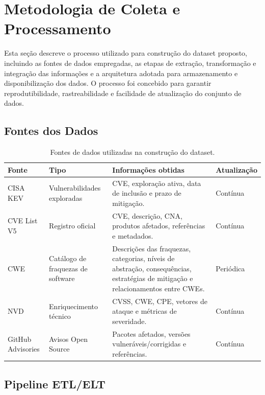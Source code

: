 \section{Metodologia de Coleta e Processamento}

Esta seção descreve o processo utilizado para construção do dataset proposto, incluindo as fontes de dados empregadas, as etapas de extração, transformação e integração das informações e a arquitetura adotada para armazenamento e disponibilização dos dados. O processo foi concebido para garantir reprodutibilidade, rastreabilidade e facilidade de atualização do conjunto de dados.

\subsection{Fontes dos Dados}

\begin{table}[ht]
\centering
\caption{Fontes de dados utilizadas na construção do dataset.}
\label{tab:data_sources}
\small
\setlength{\tabcolsep}{4pt}
\begin{tabular}{|p{2.1cm}|p{2.7cm}|p{6.7cm}|p{2.0cm}|}
\hline
\textbf{Fonte} & \textbf{Tipo} & \textbf{Informações obtidas} & \textbf{Atualização} \\
\hline
CISA KEV & Vulnerabilidades exploradas & CVE, exploração ativa, data de inclusão e prazo de mitigação. & Contínua \\
\hline
CVE List V5 & Registro oficial & CVE, descrição, CNA, produtos afetados, referências e metadados. & Contínua \\
\hline
CWE & Catálogo de fraquezas de software & Descrições das fraquezas, categorias, níveis de abstração, consequências, estratégias de mitigação e relacionamentos entre CWEs. & Periódica \\
\hline
NVD & Enriquecimento técnico & CVSS, CWE, CPE, vetores de ataque e métricas de severidade. & Contínua \\
\hline
GitHub Advisories & Avisos Open Source & Pacotes afetados, versões vulneráveis/corrigidas e referências. & Contínua \\
\hline
\end{tabular}
\end{table}

\subsection{Pipeline ETL/ELT}
\label{sec:pipeline}


